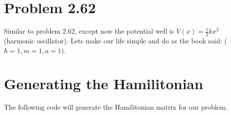 \documentclass[letterpaper,10pt,english]{jupyterBook}
\begin{document}
\chapter{Problem 2.62}
\label{\detokenize{2.62-harmonic:problem-2-62}}\label{\detokenize{2.62-harmonic::doc}}
\sphinxAtStartPar
Similar to problem 2.62, except now the potential well is \(V(x)=\frac{1}{2}kx^2\) (harmonic oscillator). Lets make our life simple and do as the book said: (\(\hbar=1, m=1, a=1\)).


\chapter{Generating the Hamilitonian}
\label{\detokenize{2.62-harmonic:generating-the-hamilitonian}}
\sphinxAtStartPar
The following code will generate the Hamilitonian matrix for our problem.
\end{document}
